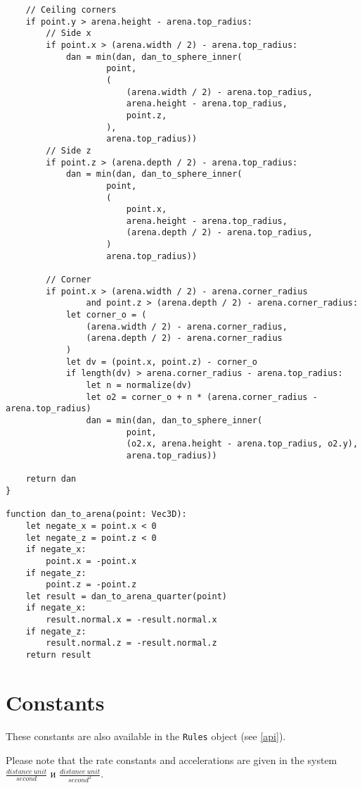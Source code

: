 \begin{verbatim}
    // Ceiling corners
    if point.y > arena.height - arena.top_radius:
        // Side x
        if point.x > (arena.width / 2) - arena.top_radius:
            dan = min(dan, dan_to_sphere_inner(
                    point,
                    (
                        (arena.width / 2) - arena.top_radius,
                        arena.height - arena.top_radius,
                        point.z,
                    ),
                    arena.top_radius))
        // Side z
        if point.z > (arena.depth / 2) - arena.top_radius:
            dan = min(dan, dan_to_sphere_inner(
                    point,
                    (
                        point.x,
                        arena.height - arena.top_radius,
                        (arena.depth / 2) - arena.top_radius,
                    )
                    arena.top_radius))

        // Corner
        if point.x > (arena.width / 2) - arena.corner_radius
                and point.z > (arena.depth / 2) - arena.corner_radius:
            let corner_o = (
                (arena.width / 2) - arena.corner_radius,
                (arena.depth / 2) - arena.corner_radius
            )
            let dv = (point.x, point.z) - corner_o
            if length(dv) > arena.corner_radius - arena.top_radius:
                let n = normalize(dv)
                let o2 = corner_o + n * (arena.corner_radius - arena.top_radius)
                dan = min(dan, dan_to_sphere_inner(
                        point,
                        (o2.x, arena.height - arena.top_radius, o2.y),
                        arena.top_radius))
    
    return dan    
}

function dan_to_arena(point: Vec3D):
    let negate_x = point.x < 0
    let negate_z = point.z < 0
    if negate_x:
        point.x = -point.x
    if negate_z:
        point.z = -point.z
    let result = dan_to_arena_quarter(point)
    if negate_x:
        result.normal.x = -result.normal.x
    if negate_z:
        result.normal.z = -result.normal.z
    return result
\end{verbatim}

\section{Constants}\label{constants}

These constants are also available in the \texttt{Rules} object (see \ref{api}).

Please note that the rate constants and accelerations are given in the system
$\frac{distance\ unit}{second}$ и $\frac{distance\ unit}{second^2}$.

